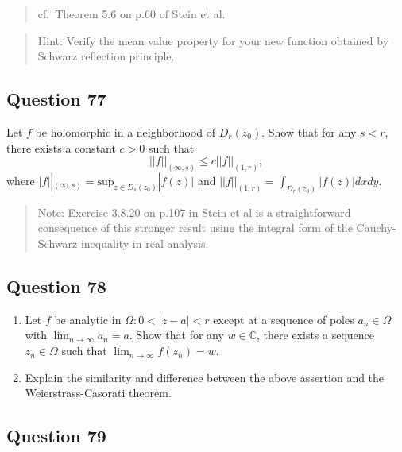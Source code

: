 \documentclass[12pt]{article}
\begin{document}
\begin{quote}
cf.~Theorem 5.6 on p.60 of Stein et al.
\end{quote}

\begin{quote}
Hint: Verify the mean value property for your new function obtained by
Schwarz reflection principle.
\end{quote}

\hypertarget{question-77-2}{%
\subsection{Question 77}\label{question-77-2}}

Let \(f\) be holomorphic in a neighborhood of \(D_r(z_0)\). Show that
for any \(s<r\), there exists a constant \(c>0\) such that
\[||f||_{(\infty, s)} \leq c ||f||_{(1, r)},\] where
\(\displaystyle |f||_{(\infty, s)} = \text{sup}_{z \in D_s(z_0)}|f(z)|\)
and \(\displaystyle ||f||_{(1, r)} = \int_{D_r(z_0)} |f(z)|dx dy\).

\begin{quote}
Note: Exercise 3.8.20 on p.107 in Stein et al is a straightforward
consequence of this stronger result using the integral form of the
Cauchy-Schwarz inequality in real analysis.
\end{quote}

\hypertarget{question-78-2}{%
\subsection{Question 78}\label{question-78-2}}

\begin{enumerate}
\def\labelenumi{(\arabic{enumi})}
\item
  Let \(f\) be analytic in \(\Omega: 0<|z-a|<r\) except at a sequence of
  poles \(a_n \in \Omega\) with \(\lim_{n \rightarrow \infty} a_n = a\).
  Show that for any \(w \in \mathbb C\), there exists a sequence
  \(z_n \in \Omega\) such that
  \(\lim_{n \rightarrow \infty} f(z_n) = w\).
\item
  Explain the similarity and difference between the above assertion and
  the Weierstrass-Casorati theorem.
\end{enumerate}

\hypertarget{question-79-2}{%
\subsection{Question 79}\label{question-79-2}}
\end{document}
